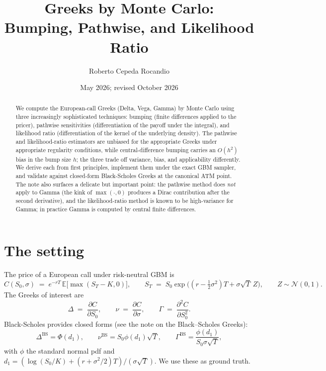 \documentclass[11pt,a4paper]{article}
\title{Greeks by Monte Carlo:\\
       Bumping, Pathwise, and Likelihood Ratio}
\author{Roberto Cepeda Rocandio}
\date{May 2026; revised October 2026}
\theoremstyle{plain}
\theoremstyle{definition}
\theoremstyle{remark}
\newcommand{\E}{\mathbb{E}}
\begin{document}
\maketitle

\begin{abstract}
We compute the European-call Greeks (Delta, Vega, Gamma) by Monte
Carlo using three increasingly sophisticated techniques: bumping
(finite differences applied to the pricer), pathwise sensitivities
(differentiation of the payoff under the integral), and likelihood
ratio (differentiation of the kernel of the underlying density). The
pathwise and likelihood-ratio estimators are unbiased for the
appropriate Greeks under appropriate regularity conditions, while
central-difference bumping carries an $O(h^2)$ bias in the bump size
$h$; the three trade off variance, bias, and applicability
differently. We derive each from first principles,
implement them under the exact GBM sampler, and
validate against closed-form Black-Scholes Greeks at the canonical
ATM point. The note also surfaces a delicate but important point:
the pathwise method does \emph{not} apply to Gamma (the kink of
$\max(\cdot, 0)$ produces a Dirac contribution after the second
derivative), and the likelihood-ratio method is known to be
high-variance for Gamma; in practice Gamma is computed by central
finite differences.
\end{abstract}

\tableofcontents

\section{The setting}
\label{sec:setting}

The price of a European call under risk-neutral GBM is
\begin{equation}
C(S_0, \sigma) \;=\; e^{-rT}\,\E\bigl[\max(S_T - K, 0)\bigr],
\qquad
S_T \;=\; S_0 \exp\bigl((r - \tfrac{1}{2}\sigma^2)T + \sigma\sqrt T\,Z\bigr),
\qquad Z \sim \mathcal{N}(0, 1).
\end{equation}
The Greeks of interest are
\begin{equation}
\Delta \;=\; \frac{\partial C}{\partial S_0},
\qquad
\nu \;=\; \frac{\partial C}{\partial \sigma},
\qquad
\Gamma \;=\; \frac{\partial^2 C}{\partial S_0^2}.
\end{equation}
Black-Scholes provides closed forms (see the note on the Black--Scholes
Greeks):
\begin{equation}
\Delta^{\mathrm{BS}} = \Phi(d_1),
\qquad
\nu^{\mathrm{BS}} = S_0 \phi(d_1) \sqrt T,
\qquad
\Gamma^{\mathrm{BS}} = \frac{\phi(d_1)}{S_0 \sigma \sqrt T},
\end{equation}
with $\phi$ the standard normal pdf and $d_1 = (\log(S_0/K) + (r +
\sigma^2/2)T)/(\sigma\sqrt T)$. We use these as ground truth.
\end{document}
